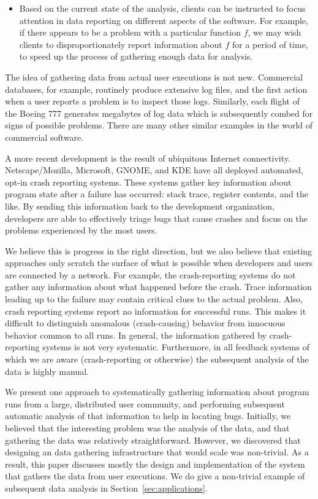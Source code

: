 \begin{itemize}
\item Based on the current state of the analysis, clients can be
instructed to focus attention in data reporting on different aspects
of the software.  For example, if there appears to be a problem
with a particular function $f$, we may wish clients to disproportionately
report information about $f$ for a period of time, to speed up
the process of gathering enough data for analysis.

\end{itemize}

The idea of gathering data from actual user executions is not new.
Commercial databases, for example, routinely produce extensive
log files, and the first action when a user reports a problem is
to inspect those logs.  Similarly, each flight of the Boeing 777
generates megabytes of log data which is subsequently combed
for signs of possible problems.  There are many other similar
examples in the world of commercial software.

A more recent development is the result of ubiquitous Internet
connectivity.  Netscape/Mozilla, Microsoft, GNOME, and KDE have all
deployed automated, opt-in crash reporting systems.  These systems
gather key information about program state after a failure has
occurred: stack trace, register contents, and the like.  By sending
this information back to the development organization, developers are
able to effectively triage bugs that cause crashes and focus on the
problems experienced by the most users.

We believe this is progress in the right direction, but we also
believe that existing approaches only scratch the surface of what
is possible when developers and users are connected by a network.
For example, the crash-reporting systems do not gather any information
about what happened before the crash.  Trace information
leading up to the failure may contain critical clues to the actual
problem.  Also, crash reporting systems
report no information for successful runs.  This makes it difficult to
distinguish anomalous (crash-causing) behavior from innocuous behavior
common to all runs.  In general, the information gathered by 
crash-reporting systems is not very systematic.  Furthermore, in all
feedback systems of which we are aware (crash-reporting or otherwise)
the subsequent analysis of the data is highly manual.

We present one approach to systematically gathering information
about program runs from a large, distributed user community, and
performing subsequent automatic analysis of that information to
help in locating bugs.  Initially, we believed that the interesting
problem was the analysis of the data, and that gathering the
data was relatively straightforward.  However, we discovered that
designing an data gathering infrastructure that would scale was
non-trivial.  As a result, this paper discusses mostly the design
and implementation of the system that gathers the data from user
executions. We do give a non-trivial example of subsequent data analysis
in Section~\ref{sec:applications}.

